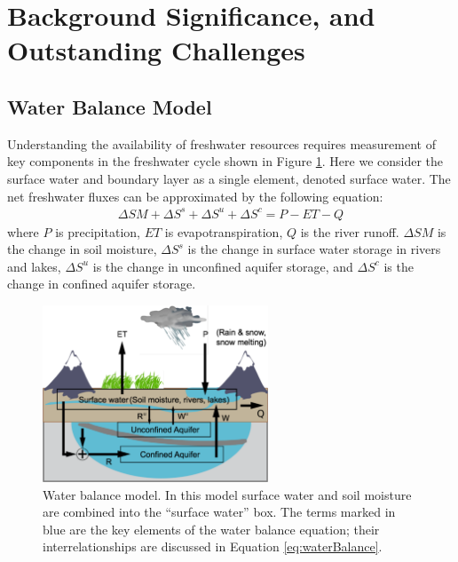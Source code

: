 \documentclass[11pt,final]{article}%
\begin{document}
\section{Background Significance, and Outstanding Challenges}
\subsection{Water Balance Model}
Understanding the availability of freshwater resources requires measurement of key components in the freshwater cycle shown in Figure \ref{fig:watercycle}. Here we consider the surface water and boundary layer as a single element, denoted surface water. The net freshwater fluxes can be approximated by the following equation:
\begin{align}
\Delta SM +\Delta S^s +\Delta S^u + \Delta S^c = P-ET-Q
\label{eq:waterBalance}  
\end{align}
where $P$ is precipitation, $ET$ is evapotranspiration, $Q$ is the river runoff. $\Delta SM$ is the change in soil moisture, $\Delta S^s$ is the change in surface water storage in rivers and lakes, $\Delta S^u$ is the change in unconfined aquifer storage, and $\Delta S^c$  is the change in confined aquifer storage.

\begin{figure}
\noindent\includegraphics[width=0.6\textwidth]{Figures/watercycle.pdf}
\caption{Water balance model. In this model surface water and soil moisture are combined into the “surface water” box.  The terms marked in blue are the key elements of the water balance equation; their interrelationships are discussed in Equation \ref{eq:waterBalance}.}
\label{fig:watercycle}
\end{figure}
\end{document}
